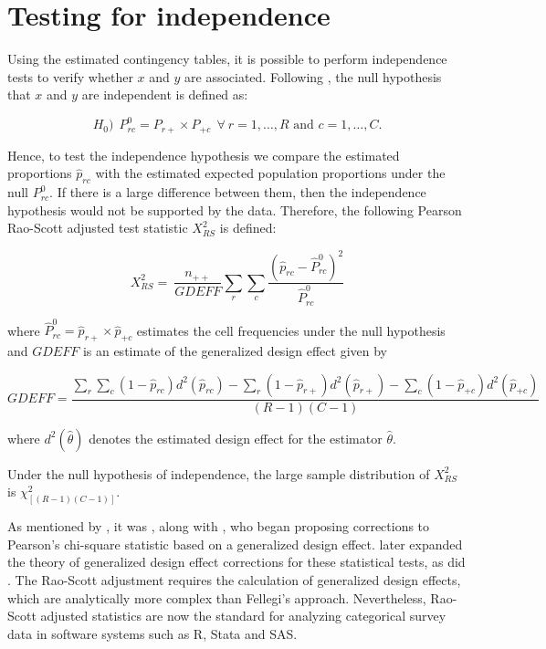 \documentclass[
  12pt,
]{book}
\begin{document}
\hypertarget{testing-for-independence}{%
\section{Testing for independence}\label{testing-for-independence}}

Using the estimated contingency tables, it is possible to perform independence tests to verify whether \(x\) and \(y\) are associated. Following \citet{Heeringa2017}, the null hypothesis that \(x\) and \(y\) are independent is defined as:

\[
H_0) \ \ P_{rc}^0 = {P_{r+} \times P_{+c}} \ \ \forall \ r=1, \ldots, R \text{ and } c=1, \ldots, C.
\]

Hence, to test the independence hypothesis we compare the estimated proportions \(\widehat{p}_{rc}\) with the estimated expected population proportions under the null \(P_{rc}^0\). If there is a large difference between them, then the independence hypothesis would not be supported by the data. Therefore, the following Pearson Rao-Scott adjusted test statistic \(X_{RS}^2\) \citep{Rao1984} is defined:

\[
X_{RS}^2 =\ \frac {n_{++}} {GDEFF} \sum_r \sum_c \frac{\left(\widehat{p}_{rc} - \widehat P_{rc}^0 \right)^2}{\widehat P_{rc}^0}
\]

where \(\widehat P_{rc}^0 = \widehat p_{r+} \times \widehat p_{+c}\) estimates the cell frequencies under the null hypothesis and \(GDEFF\) is an estimate of the generalized design effect given by

\[
GDEFF = \frac{\sum_{r}\sum_{c}\left(1 - \widehat p_{rc}\right) d^{2}\left(\widehat p_{rc}\right) - \sum_{r} \left(1 - \widehat p_{r+} \right) d^{2}\left(\widehat p_{r+}\right) - \sum_{c} \left( 1 - \widehat p_{+c} \right) d^{2} \left( \widehat p_{+c} \right)} {\left(R-1\right)\left(C-1\right)}
\]

where \(d^2 \left({\widehat \theta}\right)\) denotes the estimated design effect for the estimator \({\widehat \theta}\).

Under the null hypothesis of independence, the large sample distribution of \(X_{RS}^2\) is \(\chi^2_{[(R-1) (C-1)]}\).

As mentioned by \citet{Heeringa2017}, it was \citet{Fay1979}, along with \citet{Fellegi1980}, who began proposing corrections to Pearson's chi-square statistic based on a generalized design effect. \citet{Rao1984} later expanded the theory of generalized design effect corrections for these statistical tests, as did \citet{thomas1987small_sample}. The Rao-Scott adjustment requires the calculation of generalized design effects, which are analytically more complex than Fellegi's approach. Nevertheless, Rao-Scott adjusted statistics are now the standard for analyzing categorical survey data in software systems such as R, Stata and SAS.
\end{document}
